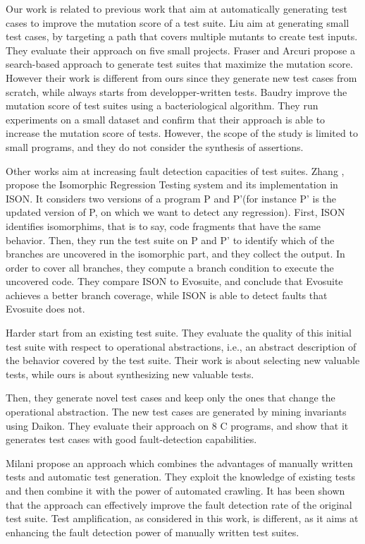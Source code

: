 Our work is related to previous work that aim at automatically generating test cases to improve the mutation score of a test suite.
Liu \etal \cite{multiple-mutants} aim at generating small test cases, by targeting a path that covers multiple mutants to create test inputs. They evaluate their approach on five small projects. Fraser and Arcuri \cite{evosuite:emse14_mutation} propose a search-based approach to generate test suites that maximize the mutation score. However their work is different from ours since they generate new test cases from scratch, while \dspot always starts from developper-written tests. 
Baudry \etal \cite{Baudry05a} improve the mutation score of test suites using a bacteriological algorithm. They run experiments on a small dataset and confirm that their approach is able to increase the mutation score of tests. However, the scope of the study is limited to small programs, and they do not consider the synthesis of assertions.

Other works aim at increasing fault detection capacities of test suites.
Zhang \etal \cite{Zhang:2016:IRT:2950290.2950313}, propose the Isomorphic Regression Testing system and its implementation in ISON. It considers two versions of a program P and P'(for instance P' is the updated version of P, on which we want to detect any regression). First, ISON identifies isomorphims, that is to say, code fragments that have the same behavior. Then, they run the test suite on P and P' to identify which of the branches are uncovered in the isomorphic part, and they  collect the output. In order to cover all branches, they compute a branch condition to execute the uncovered code. They compare ISON to Evosuite,  and conclude that Evosuite achieves a better branch coverage, while ISON is able to detect faults that Evosuite does not.

Harder \etal \cite{Harder03} start from an existing test suite. They evaluate the quality of this initial test suite with respect to operational abstractions, i.e., an abstract description of the behavior covered by the test suite. Their work is about selecting new valuable tests, while ours is about synthesizing new valuable tests.

Then, they generate novel test cases and keep only the ones that change the operational abstraction.
The new test cases are generated by mining invariants using Daikon.  They evaluate their approach on 8 C programs, and show that it generates test cases with good fault-detection capabilities.


Milani \etal \cite{milani2014} propose an approach which combines the advantages of manually written tests and automatic test generation. They exploit the knowledge of existing tests and then combine it with the power of automated crawling. It has been shown that the approach can effectively improve the fault detection rate of the original test suite.
Test amplification, as considered in this work, is different, as it aims at enhancing the fault detection power of manually written test suites.

